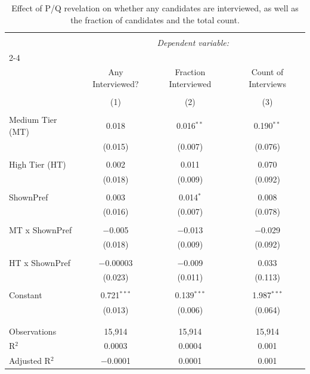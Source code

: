 
\begin{table}[!htbp] \centering 
  \caption{Effect of P/Q revelation on whether any candidates are interviewed, as well as the fraction of candidates and the total count.} 
  \label{tab:interviews} 
\begin{tabular}{@{\extracolsep{5pt}}lccc} 
\\[-1.8ex]\hline 
\hline \\[-1.8ex] 
 & \multicolumn{3}{c}{\textit{Dependent variable:}} \\ 
\cline{2-4} 
\\[-1.8ex] & Any Interviewed? & Fraction Interviewed & Count of Interviews \\ 
\\[-1.8ex] & (1) & (2) & (3)\\ 
\hline \\[-1.8ex] 
 Medium Tier (MT) & 0.018 & 0.016$^{**}$ & 0.190$^{**}$ \\ 
  & (0.015) & (0.007) & (0.076) \\ 
  & & & \\ 
 High Tier (HT) & 0.002 & 0.011 & 0.070 \\ 
  & (0.018) & (0.009) & (0.092) \\ 
  & & & \\ 
 ShownPref & 0.003 & 0.014$^{*}$ & 0.008 \\ 
  & (0.016) & (0.007) & (0.078) \\ 
  & & & \\ 
 MT x ShownPref & $-$0.005 & $-$0.013 & $-$0.029 \\ 
  & (0.018) & (0.009) & (0.092) \\ 
  & & & \\ 
 HT x ShownPref & $-$0.00003 & $-$0.009 & 0.033 \\ 
  & (0.023) & (0.011) & (0.113) \\ 
  & & & \\ 
 Constant & 0.721$^{***}$ & 0.139$^{***}$ & 1.987$^{***}$ \\ 
  & (0.013) & (0.006) & (0.064) \\ 
  & & & \\ 
\hline \\[-1.8ex] 
Observations & 15,914 & 15,914 & 15,914 \\ 
R$^{2}$ & 0.0003 & 0.0004 & 0.001 \\ 
Adjusted R$^{2}$ & $-$0.0001 & 0.0001 & 0.001 \\ 

\end{tabular}
\end{table}
